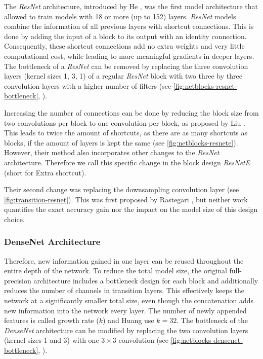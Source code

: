 \documentclass[10pt,twocolumn,letterpaper]{article}
\newcommand{\architecture}[1]{\emph{#1}}
\newcommand{\arch}[1]{\emph{#1}}
\begin{document}
The \architecture{ResNet} architecture, introduced by He \etal\cite{He2017}, was the first model architecture that allowed to train models with 18 or more (up to 152) layers.
\architecture{ResNet} models combine the information of all previous layers with shortcut connections.
This is done by adding the input of a block to its output with an identity connection.
Consequently, these shortcut connections add no extra weights and very little computational cost, while leading to more meaningful gradients in deeper layers.
The bottleneck of a \arch{ResNet} can be removed by replacing the three convolution layers (kernel sizes 1, 3, 1) of a regular \arch{ResNet} block with two three by three convolution layers with a higher number of filters (see \autoref{fig:netblocks-resnet-bottleneck}, ).

Increasing the number of connections can be done by reducing the block size from two convolutions per block to one convolution per block, as proposed by Liu \etal\cite{Liu_2018_ECCV}.
This leads to twice the amount of shortcuts, as there are as many shortcuts as blocks, if the amount of layers is kept the same (see \autoref{fig:netblocks-resnete}).
However, their method also incorporates other changes to the \arch{ResNet} architecture.
Therefore we call this specific change in the block design \architecture{ResNetE} (short for Extra shortcut).

Their second change was replacing the downsampling convolution layer (see \autoref{fig:transition-resnet}).
This was first proposed by Rastegari \etal\cite{Rastegari2016}, but neither work quantifies the exact accuracy gain nor the impact on the model size of this design choice.

\subsubsection{DenseNet Architecture}\label{sec:architectures-densenet}%
Therefore, new information gained in one layer can be reused throughout the entire depth of the network.
To reduce the total model size, the original full-precision architecture includes a bottleneck design for each block and additionally reduces the number of channels in transition layers.
This effectively keeps the network at a significantly smaller total size, even though the concatenation adds new information into the network every layer.
The number of newly appended features is called growth rate ($k$) and Huang \etal\cite{Huang2016} use $k=32$.
The bottleneck of the \arch{DenseNet} architecture can be modified by replacing the two convolution layers (kernel sizes 1 and 3) with one $3 \times 3$ convolution (see \autoref{fig:netblocks-densenet-bottleneck}, ).
\end{document}
